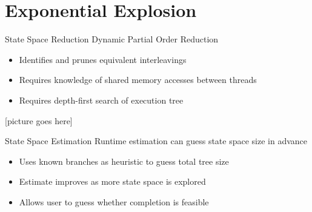 \documentclass[xcolor=dvipsnames]{beamer}
\begin{document}

\section{Exponential Explosion}



\begin{frame}{State Space Reduction}
	Dynamic Partial Order Reduction
	\begin{itemize}
		\item Identifies and prunes equivalent interleavings
		\item Requires knowledge of shared memory accesses between threads
		\item Requires depth-first search of execution tree
	\end{itemize}
	\pause
	\linegap

	[picture goes here]


\end{frame}

\begin{frame}{State Space Estimation}
	Runtime estimation can guess state space size in advance
	\begin{itemize}
		\item Uses known branches as heuristic to guess total tree size
		\item Estimate improves as more state space is explored
		\item Allows user to guess whether completion is feasible
	\end{itemize}


\end{frame}
\end{document}
